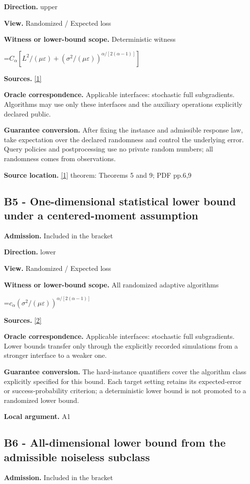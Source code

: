 \documentclass[10pt,a4paper]{article}
\newcommand{\AtlasMath}[1]{\par\begingroup\centering\setbox0=\hbox{$\displaystyle #1$}\ifdim\wd0>1.4\linewidth\typeout{ATLAS WIDE FORMULA: \the\wd0}\fi\ifdim\wd0>\linewidth\resizebox{\linewidth}{!}{\box0}\else\box0\fi\par\endgroup}
\begin{document}
\textbf{Direction.} upper

\textbf{View.} Randomized / Expected loss

\textbf{Witness or lower-bound scope.} Deterministic witness

\AtlasMath{C_\alpha[L^2/(\mu\varepsilon)+(\sigma^2/(\mu\varepsilon))^{\alpha/[2(\alpha-1)]}]}
\textbf{Sources.} \href{https://arxiv.org/pdf/2303.12277}{[1]}

\textbf{Oracle correspondence.} Applicable interfaces: stochastic full subgradients. Algorithms may use only these interfaces and the auxiliary operations explicitly declared public.

\textbf{Guarantee conversion.} After fixing the instance and admissible response law, take expectation over the declared randomness and control the underlying error. Query policies and postprocessing use no private random numbers; all randomness comes from observations.

\textbf{Source location.} \href{https://arxiv.org/pdf/2303.12277}{[1]} theorem: Theorems 5 and 9; PDF pp.6,9

\subsection{B5 - One-dimensional statistical lower bound under a centered-moment assumption}
\textbf{Admission.} Included in the bracket

\textbf{Direction.} lower

\textbf{View.} Randomized / Expected loss

\textbf{Witness or lower-bound scope.} All randomized adaptive algorithms

\AtlasMath{c_\alpha (\sigma^2/(\mu\varepsilon))^{\alpha/[2(\alpha-1)]}}
\textbf{Sources.} \href{https://arxiv.org/pdf/2609.10874}{[2]}

\textbf{Oracle correspondence.} Applicable interfaces: stochastic full subgradients. Lower bounds transfer only through the explicitly recorded simulations from a stronger interface to a weaker one.

\textbf{Guarantee conversion.} The hard-instance quantifiers cover the algorithm class explicitly specified for this bound. Each target setting retains its expected-error or success-probability criterion; a deterministic lower bound is not promoted to a randomized lower bound.

\textbf{Local argument.} A1

\subsection{B6 - All-dimensional lower bound from the admissible noiseless subclass}
\textbf{Admission.} Included in the bracket
\end{document}

